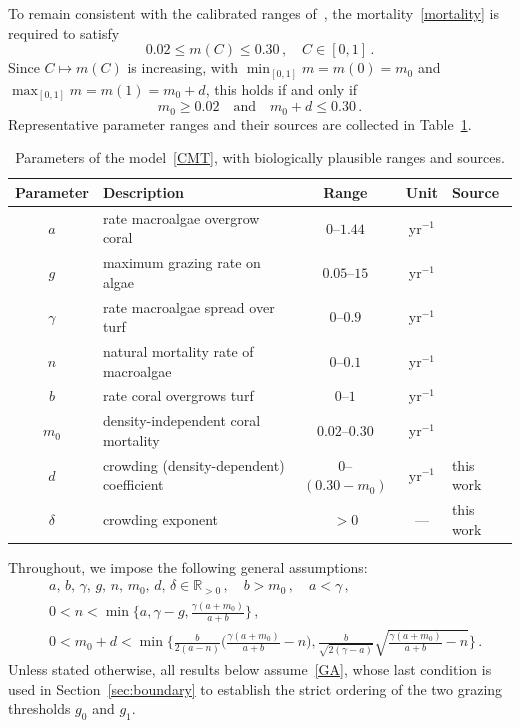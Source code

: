 \documentclass[reqno,11pt]{amsart}
\numberwithin{equation}{section}
\newcommand{\R}{\mathbb{R}}
\begin{document}
To remain consistent with the calibrated ranges of~\cite{Fun11}, the mortality~\eqref{mortality} is required to satisfy
\[
0.02\le m(C)\le 0.30\,,\quad C\in[0,1]\,.
\]
Since $C\mapsto m(C)$ is increasing, with $\min_{[0,1]}m=m(0)=m_0$ and $\max_{[0,1]}m=m(1)=m_0+d$, this holds if and only if
\[
m_0\ge 0.02\quad\text{and}\quad m_0+d\le 0.30\,.
\]
Representative parameter ranges and their sources are collected in Table~\ref{tab:params}.

\begin{table}[H]
\centering
\small
\setlength{\tabcolsep}{5pt}
\renewcommand{\arraystretch}{1.2}
\begin{tabular}{clccl}
\toprule
\textbf{Parameter} & \textbf{Description} & \textbf{Range} & \textbf{Unit} & \textbf{Source}\\
\midrule
$a$      & rate macroalgae overgrow coral           & $0$--$1.44$        & yr$^{-1}$ & \cite{Fun11}\\
$g$      & maximum grazing rate on algae            & $0.05$--$15$       & yr$^{-1}$ & \cite{Fun11}\\
$\gamma$ & rate macroalgae spread over turf         & $0$--$0.9$         & yr$^{-1}$ & \cite{Fun11}\\
$n$      & natural mortality rate of macroalgae     & $0$--$0.1$         & yr$^{-1}$ & \cite{ZhYu22}\\
$b$      & rate coral overgrows turf                & $0$--$1$           & yr$^{-1}$ & \cite{Fun11}\\
$m_0$    & density-independent coral mortality      & $0.02$--$0.30$     & yr$^{-1}$ & \cite{Fun11}\\
$d$      & crowding (density-dependent) coefficient & $0$--$(0.30-m_0)$  & yr$^{-1}$ & this work\\
$\delta$ & crowding exponent                        & $>0$               & ---       & this work\\
\bottomrule
\end{tabular}
\caption{Parameters of the model~\eqref{CMT}, with biologically plausible ranges and sources.}
\label{tab:params}
\end{table}

Throughout, we impose the following general assumptions:
\begin{equation}\label{GA}\tag{GA}
\begin{aligned}
& a,\,b,\,\gamma,\,g,\,n,\,m_0,\,d,\,\delta\in\R_{>0}\,,\quad b>m_0\,,\quad a<\gamma\,, \\[1ex]
& 0<n<\min\Big\{a, \gamma-g, \tfrac{\gamma(a+m_0)}{a+b}\Big\}\,, \\[1ex]
& 0<m_0+d<\min\Big\{\tfrac{b}{2(a-n)}\Big(\tfrac{\gamma(a+m_0)}{a+b}-n\Big), \tfrac{b}{\sqrt{2(\gamma-a)}}\sqrt{\tfrac{\gamma(a+m_0)}{a+b}-n}\Big\}\,.
\end{aligned}
\end{equation}
Unless stated otherwise, all results below assume~\eqref{GA}, whose last condition is used in Section~\ref{sec:boundary} to establish the strict ordering of the two grazing thresholds $g_0$ and $g_1$.
\end{document}
